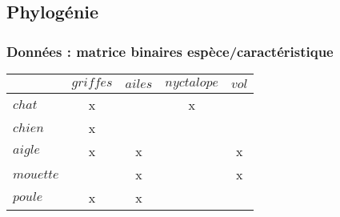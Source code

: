 \documentclass{beamer}
\begin{document}
\subsection{Phylogénie}

\begin{frame}
	\frametitle{Données : matrice binaires espèce/caractéristique}
	\begin{center}
		\begin{tabular}{ l | c c c c }
			 & $griffes$ & $ailes$ & $nyctalope$ & $vol$ \\
			\hline
			$chat$ & x & & x & \\
			$chien$ & x & & & \\
			$aigle$ & x & x & & x \\
			$mouette$ & & x & & x \\
			$poule$ & x & x & & \\
		\end{tabular}
	\end{center}
\end{frame}
\end{document}
